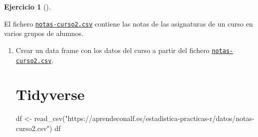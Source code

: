 \documentclass[
  a4paper,
]{scrreport}
\newenvironment{Shaded}{\begin{snugshade}}{\end{snugshade}}
\newcommand{\FunctionTok}[1]{\textcolor[rgb]{0.28,0.35,0.67}{#1}}
\newcommand{\NormalTok}[1]{\textcolor[rgb]{0.00,0.23,0.31}{#1}}
\newcommand{\OtherTok}[1]{\textcolor[rgb]{0.00,0.23,0.31}{#1}}
\newcommand{\StringTok}[1]{\textcolor[rgb]{0.13,0.47,0.30}{#1}}
\theoremstyle{definition}
\newtheorem{exercise}{Ejercicio}[chapter]
\theoremstyle{remark}
\begin{document}
\begin{exercise}[]\protect\hypertarget{exr-preprocesamiento-3}{}\label{exr-preprocesamiento-3}

El fichero \href{datos/notas-curso2.csv}{\texttt{notas-curso2.csv}}
contiene las notas de las asignaturas de un curso en varios grupos de
alumnos.

\begin{enumerate}
\def\labelenumi{\alph{enumi}.}
\item
  Crear un data frame con los datos del curso a partir del fichero
  \href{datos/notas-curso2.csv}{\texttt{notas-curso2.csv}}.

  \begin{tcolorbox}[enhanced jigsaw, colframe=quarto-callout-tip-color-frame, toprule=.15mm, bottomtitle=1mm, breakable, opacitybacktitle=0.6, toptitle=1mm, colback=white, bottomrule=.15mm, title=\textcolor{quarto-callout-tip-color}{\faLightbulb}\hspace{0.5em}{Solución}, arc=.35mm, left=2mm, titlerule=0mm, rightrule=.15mm, coltitle=black, leftrule=.75mm, opacityback=0, colbacktitle=quarto-callout-tip-color!10!white]

  \section{Tidyverse}

\begin{Shaded}
\begin{Highlighting}[]
\NormalTok{df }\OtherTok{\textless{}{-}} \FunctionTok{read\_csv}\NormalTok{(}\StringTok{"https://aprendeconalf.es/estadistica{-}practicas{-}r/datos/notas{-}curso2.csv"}\NormalTok{)}
\NormalTok{df}
\end{Highlighting}
\end{Shaded}


\end{tcolorbox}
\end{enumerate}
\end{exercise}
\end{document}
